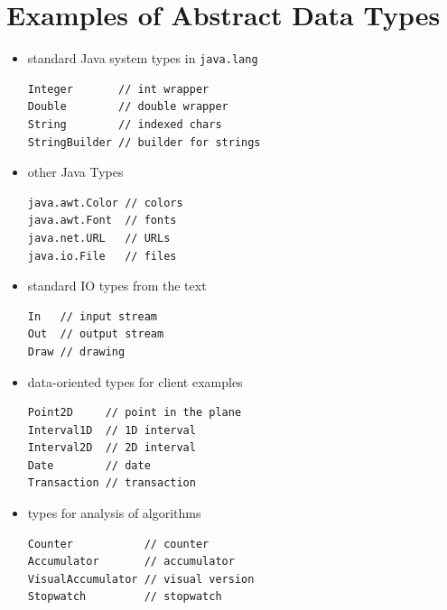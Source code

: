\documentclass[8pt,a4paper,compress]{beamer}
\begin{document}
\section{Examples of Abstract Data Types}
\begin{frame}[fragile]
\begin{itemize}
\item standard Java system types in \lstinline{java.lang}
\begin{lstlisting}[language={},mathescape]
Integer       // int wrapper
Double        // double wrapper
String        // indexed chars
StringBuilder // builder for strings
\end{lstlisting}

\item other Java Types
\begin{lstlisting}[language={},mathescape]
java.awt.Color // colors
java.awt.Font  // fonts
java.net.URL   // URLs
java.io.File   // files
\end{lstlisting}

\item standard IO types from the text
\begin{lstlisting}[language={},mathescape]
In   // input stream
Out  // output stream
Draw // drawing
\end{lstlisting}

\item data-oriented types for client examples
\begin{lstlisting}[language={},mathescape]
Point2D     // point in the plane
Interval1D  // 1D interval
Interval2D  // 2D interval
Date        // date
Transaction // transaction
\end{lstlisting}

\item types for analysis of algorithms
\begin{lstlisting}[language={},mathescape]
Counter           // counter
Accumulator       // accumulator
VisualAccumulator // visual version
Stopwatch         // stopwatch
\end{lstlisting}
\end{itemize}
\end{frame}
\end{document}
